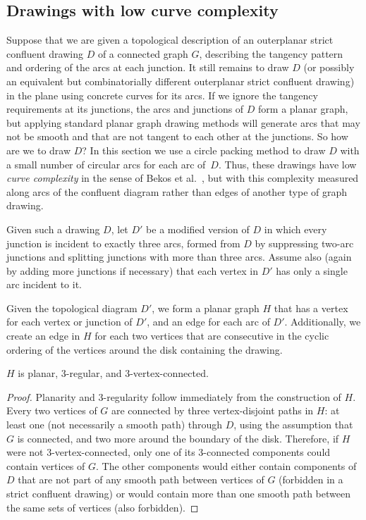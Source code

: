 \documentclass{llncs}
\begin{document}
\subsection{Drawings with low curve complexity}\label{sec:curvecomplexity}

Suppose that we are given a topological description of an outerplanar strict confluent drawing $D$ of a connected graph $G$, describing the tangency pattern and ordering of the arcs at each junction. It still remains to draw $D$ (or possibly an equivalent but combinatorially different outerplanar strict confluent drawing) in the plane using concrete curves for its arcs. If we ignore the tangency requirements at its junctions, the arcs and junctions of $D$ form a planar graph, but applying standard planar graph drawing methods will generate arcs that may not be smooth and that are not tangent to each other at the junctions. So how are we to draw $D$? In this section we use a circle packing method to draw $D$ with a small number of circular arcs for each arc of~$D$.
Thus, these drawings have low \emph{curve complexity} in the sense of Bekos et al.~\cite{BekKauKob-GD-12}, but with this complexity measured along arcs of the confluent diagram rather than edges of another type of graph drawing.


Given such a drawing $D$, let $D'$ be a modified version of $D$ in which every junction is incident to exactly three arcs, formed from $D$ by suppressing two-arc junctions and splitting junctions with more than three arcs.
Assume also (again by adding more junctions if necessary) that each vertex in $D'$ has only a single arc incident to it.

Given the topological diagram $D'$, we form a planar graph $H$ that has a vertex for each vertex or junction of $D'$, and an edge for each arc of $D'$.  Additionally, we create an edge in $H$ for each two vertices that are consecutive in the cyclic ordering of the vertices around the disk containing the drawing.


\begin{lemma}
\label{lem:3-regular}
$H$ is planar, 3-regular, and 3-vertex-connected.
\end{lemma}

\begin{proof}
Planarity and 3-regularity follow immediately from the construction of $H$. Every two vertices of $G$ are connected by three vertex-disjoint paths in $H$: at least one (not necessarily a smooth path) through $D$, using the assumption that $G$ is connected, and two more around the boundary of the disk. Therefore, if $H$ were not 3-vertex-connected, only one of its 3-connected components could contain vertices of $G$. The other components would either contain components of $D$ that are not part of any smooth path between vertices of $G$ (forbidden in a strict confluent drawing) or would contain more than one smooth path between the same sets of vertices (also forbidden).
\end{proof}
\end{document}
